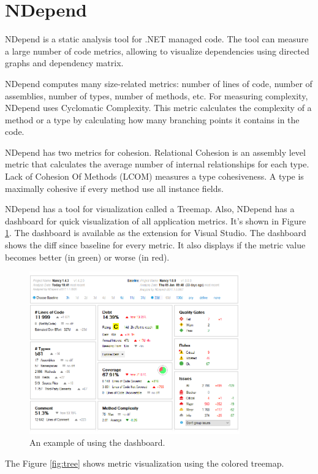 \section{NDepend}

NDepend is a static analysis tool for .NET managed code. The tool can measure a large number of code metrics, allowing to visualize dependencies using directed graphs and dependency matrix.  

NDepend computes many size-related metrics: number of lines of code, number of assemblies, number of types, number of methods, etc. For measuring complexity, NDepend uses Cyclomatic Complexity. This metric calculates the complexity of a method or a type by calculating how many branching points it contains in the code.

NDepend has two metrics for cohesion. Relational Cohesion is an assembly level metric that calculates the average number of internal relationships for each type. Lack of Cohesion Of Methods (LCOM) measures a type cohesiveness. A type is maximally cohesive if every method use all instance fields.

NDepend has a tool for visualization called a Treemap. Also, NDepend has a dashboard for quick visualization of all application metrics. It's shown in Figure \ref{fig:dash}. The dashboard is available as the extension for Visual Studio. The dashboard shows the diff since baseline for every metric. It also displays if the metric value becomes better (in green) or worse (in red). 

\begin{figure}[h]
	\centering
	\includegraphics[height=70mm]{figures/dash.png}
	\caption{An example of using the dashboard.}
	\label{fig:dash}
\end{figure}

The Figure \ref{fig:tree} shows metric visualization using the colored treemap.

